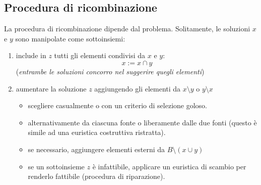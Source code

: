\documentclass{article}
\begin{document}
\subsection{Procedura di ricombinazione}
La procedura di ricombinazione dipende dal problema. Solitamente, le soluzioni $x$ e $y$
sono manipolate come sottoinsiemi:
\begin{enumerate}
    \item include in $z$ tutti gli elementi condivisi da $x$ e $y$:
    $$x:=x\cap y$$
    (\textit{entrambe le soluzioni concorro nel suggerire quegli elementi})
    \item aumentare la soluzione $z$ aggiungendo gli elementi da $x\setminus y$ o $y\setminus x$
    \begin{itemize}
        \item scegliere casualmente o con un criterio di selezione goloso.
        \item alternativamente da ciascuna fonte o liberamente
        dalle due fonti (questo è simile ad una euristica costruttiva ristratta).
        \item se necessario, aggiungere elementi esterni da $B\setminus(x\cup y)$
        \item se un sottoinsieme $z$ è infattibile, applicare un euristica di scambio per renderlo
        fattibile (procedura di riparazione).
    \end{itemize}
\end{enumerate}
\end{document}
